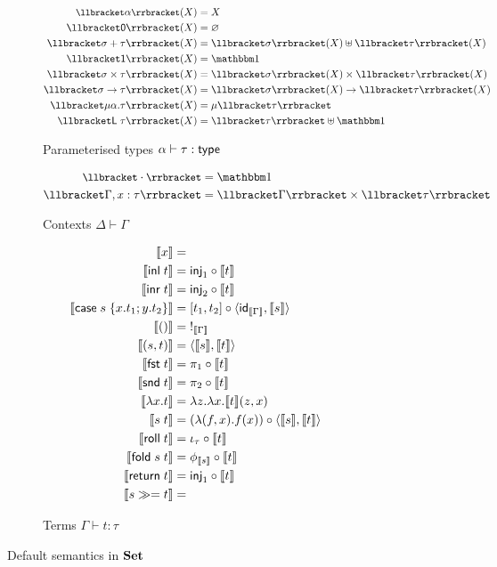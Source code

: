 \begin{figure}
\begin{subfigure}{\linewidth}
  \begin{align*}
  \small
  \sem{\alpha}(X) &= X
  \\
  \sem{\tyZero}(X) &= \varnothing
  \\
  \sem{\sigma \tySum \tau}(X) &= \sem{\sigma}(X) \uplus \sem{\tau}(X)
  \\
  \sem{\tyUnit}(X) &= \One
  \\
  \sem{\sigma \tyProd \tau}(X) &= \sem{\sigma}(X) \times \sem{\tau}(X)
  \\
  \sem{\sigma \tyFun \tau}(X) &= \sem{\sigma}(X) \to \sem{\tau}(X)
  \\
  \sem{\mu\alpha.\tau}(X) &= \mu\sem{\tau}
  \\
  \sem{\tyLift\;\tau}(X) &= \sem{\tau} \uplus \One
  \end{align*}
  \caption{Parameterised types $\alpha \vdash \tau: \mathsf{type}$}
  \label{fig:set-semantics:types}
\end{subfigure}
\begin{subfigure}{\linewidth}
  \begin{align*}
  \small
  \sem{\emptyCxt} &= \One
  \\
  \sem{\Gamma, x: \tau} &= \sem{\Gamma} \times \sem{\tau}
  \end{align*}
  \caption{Contexts $\Delta \vdash \Gamma$}
\end{subfigure}
\begin{subfigure}{\linewidth}
  \begin{align*}
  \small
  \llbracket x \rrbracket &=
  \\
  \llbracket \mathsf{inl}\;t \rrbracket &= \mathsf{inj}_1 \circ \llbracket t \rrbracket
  \\
  \llbracket \mathsf{inr}\;t \rrbracket &= \mathsf{inj}_2 \circ \llbracket t \rrbracket
  \\
  \llbracket \mathsf{case}\;s\;\{x.t_1; y.t_2\} \rrbracket &= [t_1, t_2] \circ \langle \mathsf{id}_{\llbracket \Gamma \rrbracket}, \llbracket s \rrbracket\rangle
  \\
  \llbracket () \rrbracket &=\;!_{\llbracket \Gamma \rrbracket}
  \\
  \llbracket (s,t) \rrbracket &= \langle \llbracket s \rrbracket, \llbracket t \rrbracket\rangle
  \\
  \llbracket \mathsf{fst}\;t \rrbracket &= \pi_1 \circ \llbracket t \rrbracket
  \\
  \llbracket \mathsf{snd}\;t \rrbracket &= \pi_2 \circ \llbracket t \rrbracket
  \\
  \llbracket \lambda x.t \rrbracket &= \lambda z.\lambda x.\llbracket t \rrbracket(z, x)
  \\
  \llbracket s\;t \rrbracket &= (\lambda (f, x).f(x)) \circ \langle \llbracket s \rrbracket, \llbracket t \rrbracket\rangle
  \\
  \llbracket \mathsf{roll}\;t \rrbracket &= \iota_{\tau} \circ \llbracket t \rrbracket
  \\
  \llbracket \mathsf{fold}\;s\;t \rrbracket &= \phi_{\llbracket s \rrbracket} \circ \llbracket t \rrbracket
  \\
  \llbracket \mathsf{return}\;t \rrbracket &= \mathsf{inj}_1 \circ \llbracket t \rrbracket
  \\
  \llbracket {s}\gg={t} \rrbracket &=
  \end{align*}
  \caption{Terms $\Gamma \vdash t: \tau$}
\end{subfigure}
\caption{Default semantics in $\mathbf{Set}$}
\end{figure}
